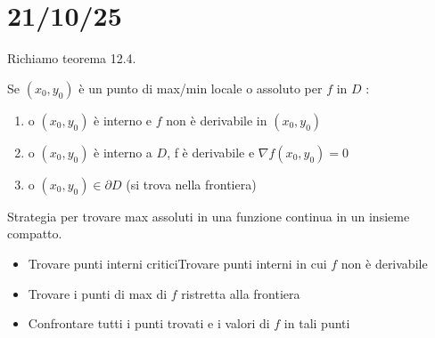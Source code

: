\documentclass[a4paper, oneside]{article}
\begin{document}
        \section{21/10/25}
        Richiamo teorema 12.4.
        \begin{theorem}
            Se $(x_0,y_0)$ è un punto di max/min locale o assoluto per $f$ in $D$ :
            \begin{enumerate}[$i)$]
                \item o $(x_0,y_0)$ è interno e $f$ non è derivabile in $(x_0,y_0)$
                \item o $(x_0,y_0)$ è interno a $D$, f è derivabile e  $\nabla f (x_0,y_0) = 0$
                \item o $(x_0,y_0) \in \partial D$ (si trova nella frontiera)  
            \end{enumerate}
        \end{theorem}
        Strategia per trovare max assoluti in una funzione continua in un insieme compatto.\\
        \begin{itemize}
            \item Trovare punti interni criticiTrovare punti interni in cui $f$ non è derivabile
            \item Trovare i punti di max di $f$ ristretta alla frontiera
            \item Confrontare tutti i punti trovati e i valori di $f$ in tali punti
        \end{itemize}
\end{document}
